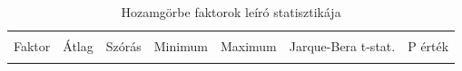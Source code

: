 \documentclass[12pt,bibliography=totoc]{article}
\begin{document}
\begin{table}[H]
\caption{Hozamgörbe faktorok leíró statisztikája}%
\fontsize{10}{10}\selectfont
\centering %
\begin{tabular}{l c c c c c c}%
\hline\hline   \\ [-1.5ex]               %
Faktor & Átlag & Szórás & Minimum & Maximum & Jarque-Bera t-stat.  & P érték \\ [0.5ex] %

\hline       \\ [-1.5ex]           %


\end{tabular}
\end{table}
\end{document}
